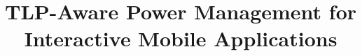\documentclass[pageno]{jpaper}
\begin{document}
\title{TLP-Aware Power Management for Interactive Mobile Applications}

\date{}
\maketitle

\thispagestyle{empty}























\end{document}
